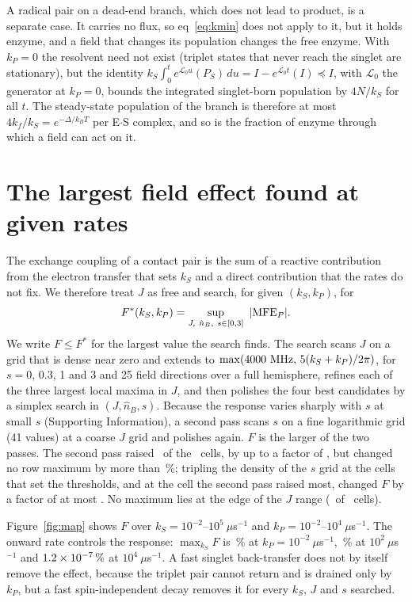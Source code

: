 \documentclass[aip,jcp,amsmath,amssymb,reprint]{revtex4-1}
\begin{document}
A radical pair on a dead-end branch, which does not lead to product, is a
separate case. It carries no flux, so eq~\ref{eq:kmin} does not apply to it,
but it holds enzyme, and a field that changes its population changes the free
enzyme. With $k_P=0$ the resolvent need not exist (triplet states that never
reach the singlet are stationary), but the identity
$k_S\int_0^t e^{\mathcal L_0u}(P_S)\,du = I - e^{\mathcal L_0t}(I)\preceq I$, with
$\mathcal L_0$ the generator at $k_P=0$, bounds the integrated singlet-born
population by $4N/k_S$ for all $t$. The steady-state population of the branch is
therefore at most $4k_f/k_S = e^{-\Delta/k_BT}$ per E$\cdot$S complex, and so is
the fraction of enzyme through which a field can act on it.

\section{The largest field effect found at given rates}
\label{sec:map}

The exchange coupling of a contact pair is the sum of a reactive contribution
from the electron transfer that sets $k_S$\cite{Fay2018} and a direct
contribution that the rates do not fix. We therefore treat $J$ as free and
search, for given $(k_S,k_P)$, for
\begin{equation}
F^*(k_S,k_P) = \sup_{J,\ \hat n_B,\ s\in[0,3]}\ |\mathrm{MFE}_P| .
\end{equation}
We write $F\le F^*$ for the largest value the search finds.
The search scans $J$ on a grid that is dense near zero and extends to
$\max(4000~{\rm MHz},\,5(k_S+k_P)/2\pi)$, for $s = 0$, 0.3, 1 and 3 and 25 field
directions over a full hemisphere, refines each of the three largest local
maxima in $J$, and then polishes the four best candidates by a simplex search
in $(J,\hat n_B,s)$. Because the response varies sharply with $s$ at small $s$
(Supporting Information), a second pass scans $s$
on a fine logarithmic grid (41 values) at a coarse $J$ grid and polishes again.
$F$ is the larger of the two passes. The second pass raised \nSuppRaised\ of the \nCells\ cells, by up to a
factor of \suppMaxRatio, but changed no row maximum by more than
\rowMaxChange\,\%; tripling the density of the $s$ grid at the cells that set the
thresholds, and at the cell the second pass raised most, changed $F$ by a factor
of at most \convMaxRatio. No maximum lies at
the edge of the $J$ range (\nEdge\ of \nCells\ cells).

Figure~\ref{fig:map} shows $F$ over $k_S = 10^{-2}$--$10^5~\mu$s$^{-1}$ and
$k_P = 10^{-2}$--$10^4~\mu$s$^{-1}$. The onward rate controls the response:
$\max_{k_S}F$ is \FkPlow\,\% at $k_P = 10^{-2}~\mu$s$^{-1}$, \FkPhundred\,\% at
$10^{2}~\mu$s$^{-1}$ and $1.2\times10^{-7}\,\%$ at $10^{4}~\mu$s$^{-1}$. A fast singlet
back-transfer does not by itself remove the effect, because the triplet pair
cannot return and is drained only by $k_P$,\cite{Denton2024} but a fast
spin-independent decay removes it for every $k_S$, $J$ and $s$ searched.
\end{document}
